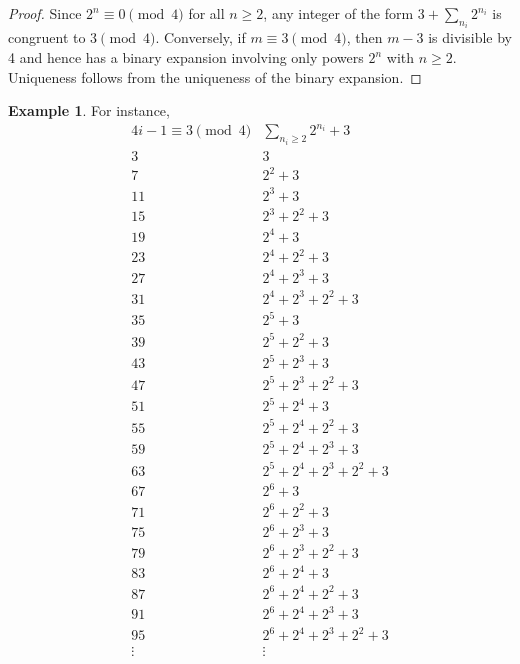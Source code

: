 \documentclass{amsart}
\theoremstyle{definition}
\newtheorem{example}[theorem]{Example}
\theoremstyle{remark}
\numberwithin{equation}{section}
\begin{document}
\begin{proof}

Since $2^{n} \equiv 0 \pmod{4}$ for all $n \ge 2$, any integer of the form $3 + \sum_{n_i} 2^{n_i}$ is congruent to $3\pmod{4}$. Conversely, if $m \equiv 3 \pmod{4}$, then $m-3$ is divisible by 4 and hence has a binary expansion involving only powers $2^{n}$ with $n \ge 2$. Uniqueness follows from the uniqueness of the binary expansion.

\end{proof}


\begin{example}	
For instance,
\small
\[
\begin{array}{c|l}
	4i-1 \equiv 3\pmod{4} & \sum_{n_i \ge 2} 2^{n_i} + 3 \\ \hline
	3  & 3 \\
	7  & 2^{2} + 3 \\
	11 & 2^{3} + 3 \\
	15 & 2^{3} + 2^{2} + 3 \\
	19 & 2^{4} + 3 \\
	23 & 2^{4} + 2^{2} + 3 \\
	27 & 2^{4} + 2^{3} + 3 \\
	31 & 2^{4} + 2^{3} + 2^{2} + 3 \\
	35 & 2^{5} + 3 \\
	39 & 2^{5} + 2^{2} + 3 \\
	43 & 2^{5} + 2^{3} + 3 \\
	47 & 2^{5} + 2^{3} + 2^{2} + 3 \\
	51 & 2^{5} + 2^{4} + 3 \\
	55 & 2^{5} + 2^{4} + 2^{2} + 3 \\
	59 & 2^{5} + 2^{4} + 2^{3} + 3 \\
	63 & 2^{5} + 2^{4} + 2^{3} + 2^{2} + 3 \\
	67 & 2^{6} + 3 \\
	71 & 2^{6} + 2^{2} + 3 \\
	75 & 2^{6} + 2^{3} + 3 \\
	79 & 2^{6} + 2^{3} + 2^{2} + 3 \\
	83 & 2^{6} + 2^{4} + 3 \\
	87 & 2^{6} + 2^{4} + 2^{2} + 3 \\
	91 & 2^{6} + 2^{4} + 2^{3} + 3 \\
	95 & 2^{6} + 2^{4} + 2^{3} + 2^{2} + 3\\
	\vdots & \vdots
\end{array}
\]
\normalsize
\end{example}
\end{document}

